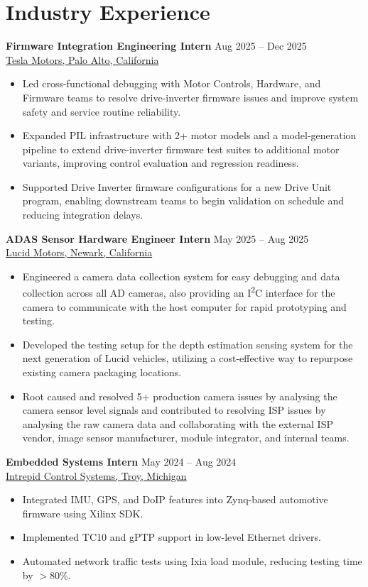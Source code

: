 \section{Industry Experience}
\textbf{Firmware Integration Engineering Intern} \hfill Aug 2025 -- Dec 2025\\
\href{https://www.tesla.com/}{Tesla Motors, Palo Alto, California}
\begin{itemize}[noitemsep,leftmargin=1em]
    \item Led cross-functional debugging with Motor Controls, Hardware, and Firmware teams to resolve drive-inverter firmware issues and improve system safety and service routine reliability.
    \item Expanded PIL infrastructure with 2+ motor models and a model-generation pipeline to extend drive-inverter firmware test suites to additional motor variants, improving control evaluation and regression readiness.
    \item Supported Drive Inverter firmware configurations for a new Drive Unit program, enabling downstream teams to begin validation on schedule and reducing integration delays.
\end{itemize}

\textbf{ADAS Sensor Hardware Engineer Intern} \hfill May 2025 -- Aug 2025\\
\href{https://www.lucidmotors.com/}{Lucid Motors, Newark, California}
\begin{itemize}[noitemsep,leftmargin=1em]
\item Engineered a camera data collection system for easy debugging and data collection across all AD cameras, also providing an I\textsuperscript{2}C interface for the camera to communicate with the host computer for rapid prototyping and testing.
\item Developed the testing setup for the depth estimation sensing system for the next generation of Lucid vehicles, utilizing a cost-effective way to repurpose existing camera packaging locations.
\item Root caused and resolved 5+ production camera issues by analysing the camera sensor level signals and contributed to resolving ISP issues by analysing the raw camera data and collaborating with the external ISP vendor, image sensor manufacturer, module integrator, and internal teams.
\end{itemize}

\textbf{Embedded Systems Intern} \hfill May 2024 -- Aug 2024\\
\href{https://www.intrepidcs.com/}{Intrepid Control Systems, Troy, Michigan}
\begin{itemize}[noitemsep,leftmargin=1em]
  \item Integrated IMU, GPS, and DoIP features into Zynq-based automotive firmware using Xilinx SDK.
  \item Implemented TC10 and gPTP support in low-level Ethernet drivers.
  \item Automated network traffic tests using Ixia load module, reducing testing time by $> 80\%$.
\end{itemize}

